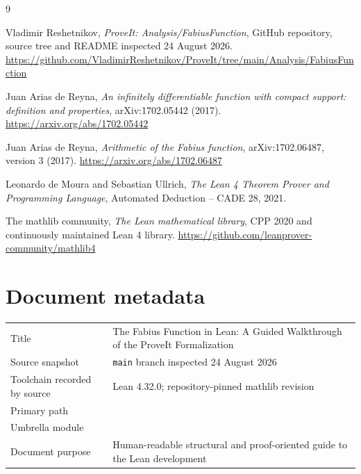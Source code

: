 \documentclass[11pt,oneside]{report}
\theoremstyle{definition}
\theoremstyle{remark}
\DeclareRobustCommand{\file}[1]{\texorpdfstring{\texttt{\expandafter\seqsplit\expandafter{\detokenize{#1}}}}{\detokenize{#1}}}
\begin{document}
\begin{thebibliography}{9}

Vladimir Reshetnikov,
\emph{ProveIt: Analysis/FabiusFunction},
GitHub repository, source tree and README inspected 24 August 2026.
\url{https://github.com/VladimirReshetnikov/ProveIt/tree/main/Analysis/FabiusFunction}

Juan Arias de Reyna,
\emph{An infinitely differentiable function with compact support: definition and properties},
arXiv:1702.05442 (2017).
\url{https://arxiv.org/abs/1702.05442}

Juan Arias de Reyna,
\emph{Arithmetic of the Fabius function},
arXiv:1702.06487, version 3 (2017).
\url{https://arxiv.org/abs/1702.06487}

Leonardo de Moura and Sebastian Ullrich,
\emph{The Lean 4 Theorem Prover and Programming Language},
Automated Deduction -- CADE 28, 2021.

The mathlib community,
\emph{The Lean mathematical library},
CPP 2020 and continuously maintained Lean 4 library.
\url{https://github.com/leanprover-community/mathlib4}

\end{thebibliography}

\chapter*{Document metadata}
\begin{tabularx}{\textwidth}{@{}lX@{}}
\toprule
Title & The Fabius Function in Lean: A Guided Walkthrough of the ProveIt Formalization \\
Source snapshot & \texttt{main} branch inspected 24 August 2026 \\
Toolchain recorded by source & Lean 4.32.0; repository-pinned mathlib revision \\
Primary path & \file{Analysis/FabiusFunction/Lean/} \\
Umbrella module & \file{FabiusFunction.lean} \\
Document purpose & Human-readable structural and proof-oriented guide to the Lean development \\
\bottomrule
\end{tabularx}
\end{document}
